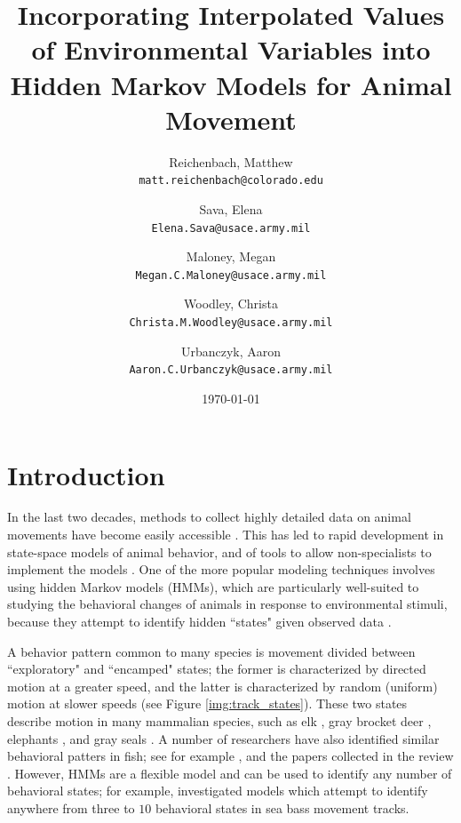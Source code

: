 \documentclass[12pt]{article}
\begin{document}
	\title{Incorporating Interpolated Values of Environmental Variables into Hidden Markov Models for Animal Movement}
	\author{
		Reichenbach, Matthew \\
		\texttt{matt.reichenbach@colorado.edu}
		\and
		Sava, Elena \\
		\texttt{Elena.Sava@usace.army.mil}
		\and
		Maloney, Megan \\
		\texttt{Megan.C.Maloney@usace.army.mil}
		\and
		Woodley, Christa \\
		\texttt{Christa.M.Woodley@usace.army.mil}
		\and
		Urbanczyk, Aaron \\
		\texttt{Aaron.C.Urbanczyk@usace.army.mil}
	}
	\date{\today}
	
	\maketitle
	
	\section{Introduction}
	
	In the last two decades, methods to collect highly detailed data on animal movements have become easily accessible \cite{McConnell2010, Tomkiewicz2010}. This has led to rapid development in state-space models of animal behavior, and of tools to allow non-specialists to implement the models \cite{Johnson2008, McClintock2012, Michelot2016, Whoriskey2017, McClintock2018}. One of the more popular modeling techniques involves using hidden Markov models (HMMs), which are particularly well-suited to studying the behavioral changes of animals in response to environmental stimuli, because they attempt to identify hidden ``states" given observed data \cite{Rabiner1989}. 
	
	A behavior pattern common to many species is movement divided between ``exploratory" and ``encamped" states; the former is characterized by directed motion at a greater speed, and the latter is characterized by random (uniform) motion at slower speeds (see Figure \ref{img:track_states}). These two states describe motion in many mammalian species, such as elk \cite{Morales2004, Fryxell2008}, gray brocket deer \cite{Grotta-Neto2019}, elephants \cite{Roever2014, Vogel2019}, and gray seals \cite{Breed2009}. A number of researchers have also identified similar behavioral patters in fish; see for example \cite{Griffiths2018, Patterson2009, Phillips2015}, and the papers collected in the review \cite{Gatti2021}. However, HMMs are a flexible model and can be used to identify any number of behavioral states; for example, \cite{Heerah2017} investigated models which attempt to identify anywhere from three to $10$ behavioral states in sea bass movement tracks.
	
\end{document}
